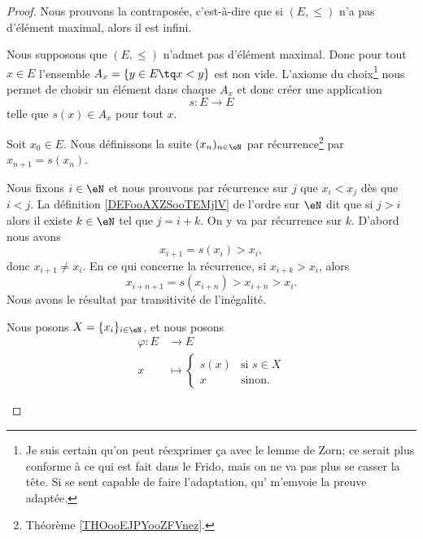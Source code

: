 \begin{proof}
	Nous prouvons la contraposée, c'est-à-dire que si \( (E,\leq)\) n'a pas d'élément maximal, alors il est infini.
	\begin{subproof}
		Nous supposons que \( (E,\leq)\) n'admet pas d'élément maximal. Donc pour tout \( x\in E\) l'ensemble \( A_x=\{ y\in E\tq x<y \}\) est non vide. L'axiome du choix\footnote{Je suis certain qu'on peut réexprimer ça avec le lemme de Zorn; ce serait plus conforme à ce qui est fait dans le Frido, mais on ne va pas plus se casser la tête. Si  se sent capable de faire l'adaptation, qu' m'emvoie la preuve adaptée.} nous permet de choisir un élément dans chaque \( A_x\) et donc créer une application
		\begin{equation}
			s \colon E\to E
		\end{equation}
		telle que \( s(x)\in A_x\) pour tout \( x\).

		\spitem[La partie \( S\)]
		Soit \( x_0\in E\). Nous définissons la suite \( (x_n)_{n\in \eN}\) par récurrence\footnote{Théorème \ref{THOooEJPYooZFVnez}.} par \( x_{n+1}=s(x_n)\).

		\spitem[\( x_i< x_j\) si \( i<j\)]		\label{SPITEMooNUVJooDKClNE}
		Nous fixons \( i\in \eN\) et nous prouvons par récurrence sur \( j\) que \( x_i<x_j\) dès que \( i<j\). La définition \ref{DEFooAXZSooTEMjlV} de l'ordre sur \( \eN\) dit que si \( j>i\) alors il existe \( k\in \eN\) tel que \( j=i+k\). On y va par récurrence sur \( k\). D'abord nous avons
		\begin{equation}
			x_{i+1}=s(x_i)>x_i,
		\end{equation}
		donc \( x_{i+1}\neq x_i\). En ce qui concerne la récurrence, si \( x_{i+k}>x_i\), alors
		\begin{equation}
			x_{i+n+1}=s(x_{i+n})>x_{i+n}>x_i.
		\end{equation}
		Nous avons le résultat par transitivité de l'inégalité.

		Nous posons \( X=\{ x_i \}_{i\in \eN}\), et nous posons
		\begin{equation}
			\begin{aligned}
				\varphi\colon E & \to E                            \\
				x               & \mapsto \begin{cases}
					                          s(x) & \text{si } s\in X \\
					                          x    & \text{sinon. }
				                          \end{cases}
			\end{aligned}
		\end{equation}


\end{subproof}
\end{proof}
